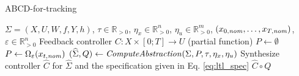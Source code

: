 
\begin{algorithm}
	\caption{ABCD-for-tracking}
	\label{alg:abcd-with-time-for-tracking}
	\begin{algorithmic}[1]
		\Require $\Sigma=(X,U,W,f,Y,h)$, $\tau \in \mathbb{R}_{>0}$, $\eta_x\in \mathbb{R}^n_{>0}$, $\eta_u\in \mathbb{R}^m_{>0}$, $(x_{0,\mathit{nom}},\ldots,x_{T,\mathit{nom}})$, $\varepsilon \in \mathbb{R}_{>0}^{n}$
		\Ensure Feedback controller $C\colon X\times [0;T]\to U$ (partial function)
		\State $P \gets \emptyset$
		\State $P \gets \Omega_{\varepsilon}(x_{t,\mathit{nom}})$
		\EndFor
		\State $(\widehat{\Sigma},Q) \gets \mathit{ComputeAbstraction}(\Sigma, P, \tau, \eta_{x} , \eta_u)$
		\State Synthesize controller $\widehat{C}$ for $\widehat{\Sigma}$ and the specification given in Eq. \eqref{eq:ltl_spec} %
		\State \Return $\widehat{C}\circ Q$
	\end{algorithmic}
\end{algorithm}






